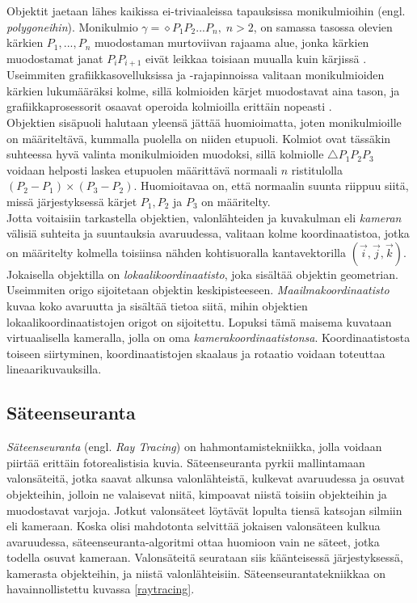 ﻿\documentclass[a4paper, 12pt, titlepage]{article}
\begin{document}
Objektit jaetaan lähes kaikissa ei-triviaaleissa tapauksissa monikulmioihin (engl. \emph{polygoneihin}). Monikulmio $\gamma = \diamond P_1P_2...P_n, \; n > 2$, on samassa tasossa olevien kärkien $P_1,...,P_n$ muodostaman murtoviivan rajaama alue, jonka kärkien muodostamat janat $P_i P_{i+1}$ eivät leikkaa toisiaan muualla kuin kärjissä \citep{harju}. Useimmiten grafiikkasovelluksissa ja -rajapinnoissa valitaan monikulmioiden kärkien lukumääräksi kolme, sillä kolmioiden kärjet muodostavat aina tason, ja grafiikkaprosessorit osaavat operoida kolmioilla erittäin nopeasti \citep{angel}.\\

Objektien sisäpuoli halutaan yleensä jättää huomioimatta, joten monikulmioille on määriteltävä, kummalla puolella on niiden etupuoli. Kolmiot ovat tässäkin suhteessa hyvä valinta monikulmioiden muodoksi, sillä kolmiolle $\triangle P_1P_2P_3$ voidaan helposti laskea etupuolen määrittävä normaali $n$ ristitulolla $(P_2-P_1) \times (P_3-P_2)$. Huomioitavaa on, että normaalin suunta riippuu siitä, missä järjestyksessä kärjet $P_1, P_2$ ja $P_3$ on määritelty. \citep[.]{hughes}\\

Jotta voitaisiin tarkastella objektien, valonlähteiden ja kuvakulman eli \emph{kameran} välisiä suhteita ja suuntauksia avaruudessa, valitaan kolme koordinaatistoa, jotka on määritelty kolmella toisiinsa nähden kohtisuoralla kantavektorilla $(\vec{i},\vec{j},\vec{k})$. Jokaisella objektilla on \emph{lokaalikoordinaatisto}, joka sisältää objektin geometrian. Useimmiten origo sijoitetaan objektin keskipisteeseen. \emph{Maailmakoordinaatisto} kuvaa koko avaruutta ja sisältää tietoa siitä, mihin objektien lokaalikoordinaatistojen origot on sijoitettu. Lopuksi tämä maisema kuvataan virtuaalisella kameralla, jolla on oma \emph{kamerakoordinaatistonsa}. Koordinaatistosta toiseen siirtyminen, koordinaatistojen skaalaus ja rotaatio voidaan toteuttaa lineaarikuvauksilla. \citep[.]{janke}

\subsection{Säteenseuranta}

\emph{Säteenseuranta} (engl. \emph{Ray Tracing}) on hahmontamistekniikka, jolla voidaan piirtää erittäin fotorealistisia kuvia. Säteenseuranta pyrkii mallintamaan valonsäteitä, jotka saavat alkunsa valonlähteistä, kulkevat avaruudessa ja osuvat objekteihin, jolloin ne valaisevat niitä, kimpoavat niistä toisiin objekteihin ja muodostavat varjoja. Jotkut valonsäteet löytävät lopulta tiensä katsojan silmiin eli kameraan. Koska olisi mahdotonta selvittää jokaisen valonsäteen kulkua avaruudessa, säteenseuranta-algoritmi ottaa huomioon vain ne säteet, jotka todella osuvat kameraan. Valonsäteitä seurataan siis käänteisessä järjestyksessä, kamerasta objekteihin, ja niistä valonlähteisiin. \citep[.]{janke} Säteenseurantatekniikkaa on havainnollistettu kuvassa \ref{raytracing}.\\
\end{document}
